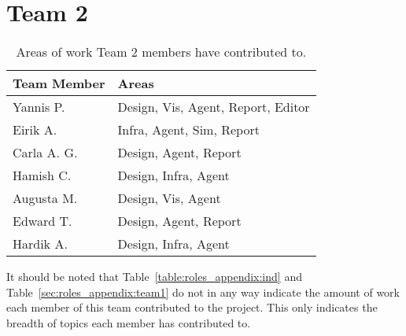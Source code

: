 \section{Team 2}
\label{sec:roles_appendix:team2}

\begin{table}[H]
    \centering
    \begin{tabular}{|l|l|}
    \hline
    \textbf{Team Member} & \textbf{Areas}                \\ \hline
    Yannis P.     & Design, Vis, Agent, Report, Editor   \\
    Eirik A.      & Infra, Agent, Sim, Report            \\
    Carla A. G.   & Design, Agent, Report                \\
    Hamish C.     & Design, Infra, Agent                 \\
    Augusta M.    & Design, Vis, Agent                   \\
    Edward T.     & Design, Agent, Report                \\
    Hardik A.     & Design, Infra, Agent                 \\ \hline
\end{tabular}
\caption{Areas of work Team 2 members have contributed to.}
\label{sec:roles_appendix:team2}
\end{table}

It should be noted that Table~\ref{table:roles_appendix:ind} and Table~\ref{sec:roles_appendix:team1} do not in any way indicate the amount of work each member of this team contributed to the project. This only indicates the breadth of topics each member has contributed to. 